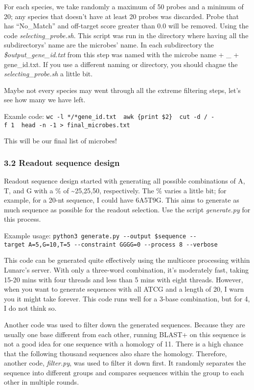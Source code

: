 \documentclass[
]{article}
\begin{document}
For each species, we take randomly a maximum of 50 probes and a minimum
of 20; any species that doesn't have at least 20 probes was discarded.
Probe that has ``No\_Match'' and off-target score greater than 0.0 will
be removed. Using the code \emph{selecting\_probe.sh}. This script was
run in the directory where having all the subdirectorys' name are the
microbes' name. In each subdirectory the \emph{\$output\_gene\_id.txt}
from this step was named with the microbe name + \_ + gene\_id.txt. If
you use a different naming or directory, you should chagne the
\emph{selecting\_probe.sh} a little bit.

Maybe not every species may went through all the extreme filtering
steps, let's see how many we have left.

Examle code:
\texttt{wc\ -l\ */*gene\_id.txt\ \textbar{}\ awk\ \textquotesingle{}\{print\ \$2\}\textquotesingle{}\ \textbar{}\ cut\ -d\ /\ -f\ 1\ \textbar{}\ head\ -n\ -1\ \textgreater{}\ final\_microbes.txt}

This will be our final list of microbes!

\subsubsection{3.2 Readout sequence
design}\label{readout-sequence-design}

Readout sequence design started with generating all possible
combinations of A, T, and G with a \% of \textasciitilde25,25,50,
respectively. The \% varies a little bit; for example, for a 20-nt
sequence, I could have 6A5T9G. This aims to generate as much sequence as
possible for the readout selection. Use the script \emph{generate.py}
for this process.

Example usage:
\texttt{python3\ generate.py\ -\/-output\ \$sequence\ -\/-target\ A=5,G=10,T=5\ -\/-constraint\ GGGG=0\ -\/-process\ 8\ -\/-verbose}

This code can be generated quite effectively using the multicore
processing within Lunarc's server. With only a three-word combination,
it's moderately fast, taking 15-20 mins with four threads and less than
5 mins with eight threads. However, when you want to generate sequences
with all ATCG and a length of 20, I warn you it might take forever. This
code runs well for a 3-base combination, but for 4, I do not think so.

Another code was used to filter down the generated sequences. Because
they are usually one base different from each other, running BLAST+ on
this sequence is not a good idea for one sequence with a homology of 11.
There is a high chance that the following thousand sequences also share
the homology. Therefore, another code, \emph{filter.py}, was used to
filter it down first. It randomly separates the sequence into different
groups and compares sequences within the group to each other in multiple
rounds.
\end{document}
